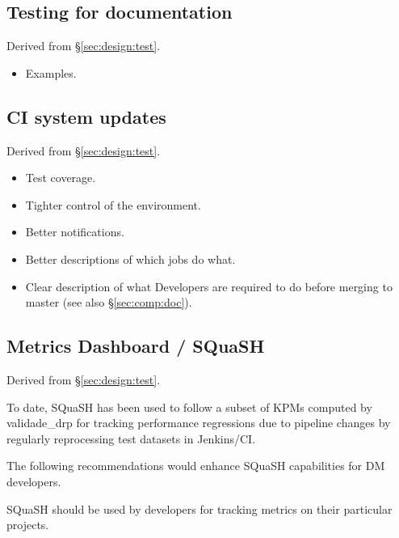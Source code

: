 \subsection{Testing for documentation}

Derived from \S\ref{sec:design:test}.


\begin{itemize}

  \item{Examples.}

\end{itemize}

\subsection{CI system updates}

Derived from \S\ref{sec:design:test}.


\begin{itemize}

  \item{Test coverage.}
  \item{Tighter control of the environment.}
  \item{Better notifications.}
  \item{Better descriptions of which jobs do what.}
  \item{Clear description of what Developers are required to do before merging
  to master (see also \S\ref{sec:comp:doc}).}

\end{itemize}


\subsection{Metrics Dashboard / SQuaSH}

Derived from \S\ref{sec:design:test}.


To date, SQuaSH has been used to follow a subset of KPMs computed by validade_drp for tracking performance regressions due to pipeline changes by regularly reprocessing test datasets in Jenkins/CI.

The following recommendations would enhance SQuaSH capabilities for DM developers.

\begin{recommendation}
SQuaSH should be used by developers for tracking metrics on their particular projects.
\end{recommendation}

